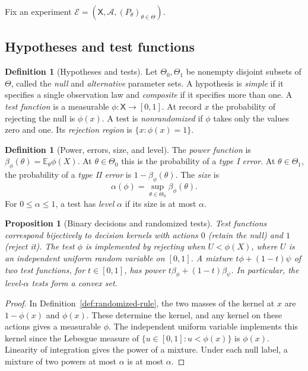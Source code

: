 \documentclass[11pt,oneside]{book}
\newtheorem{proposition}[theorem]{Proposition}
\theoremstyle{definition}
\newtheorem{definition}[theorem]{Definition}
\theoremstyle{remark}
\begin{document}
Fix an experiment $\mathcal E=(\mathsf X,\mathcal A,
(P_\theta)_{\theta\in\Theta})$.

\subsection{Hypotheses and test functions}
\label{subsec:test-functions}

\begin{definition}[Hypotheses and tests]
\label{def:hypotheses-test-function}
Let $\Theta_0,\Theta_1$ be nonempty disjoint subsets of $\Theta$,
called the \emph{null} and \emph{alternative} parameter sets.
A hypothesis is \emph{simple} if it specifies a single observation
law and \emph{composite} if it specifies more than one.
A \emph{test function} is a measurable $\phi:\mathsf X\to[0,1]$.
At record $x$ the probability of rejecting the null is $\phi(x)$.
A test is \emph{nonrandomized} if $\phi$ takes only the values zero
and one. Its \emph{rejection region} is $\{x:\phi(x)=1\}$.
\end{definition}

\begin{definition}[Power, errors, size, and level]
\label{def:test-size-power}
The \emph{power function} is $\beta_\phi(\theta)=\mathbb E_\theta\phi(X)$.
At $\theta\in\Theta_0$ this is the probability of a \emph{type I error}.
At $\theta\in\Theta_1$, the probability of a \emph{type II error} is
$1-\beta_\phi(\theta)$. The \emph{size} is
\[
\alpha(\phi)=\sup_{\theta\in\Theta_0}\beta_\phi(\theta).
\]
For $0\leq\alpha\leq1$, a test has \emph{level} $\alpha$ if its
size is at most $\alpha$.
\end{definition}

\begin{proposition}[Binary decisions and randomized tests]
\label{prop:binary-decision-test}
Test functions correspond bijectively to decision kernels with
actions $0$ (retain the null) and $1$ (reject it). The test
$\phi$ is implemented by rejecting when $U<\phi(X)$, where
$U$ is an independent uniform random variable on $[0,1]$.
A mixture $t\phi+(1-t)\psi$ of two test functions, for $t\in[0,1]$,
has power $t\beta_\phi+(1-t)\beta_\psi$. In particular,
the level-$\alpha$ tests form a convex set.
\end{proposition}
\begin{proof}
In Definition~\ref{def:randomized-rule}, the two masses of the
kernel at $x$ are $1-\phi(x)$ and $\phi(x)$. These determine the
kernel, and any kernel on these actions gives a measurable $\phi$.
The independent uniform variable implements this kernel since the
Lebesgue measure of $\{u\in[0,1]:u<\phi(x)\}$ is $\phi(x)$.
Linearity of integration gives the power of a mixture. Under each
null label, a mixture of two powers at most $\alpha$ is at most
$\alpha$.
\end{proof}
\end{document}
